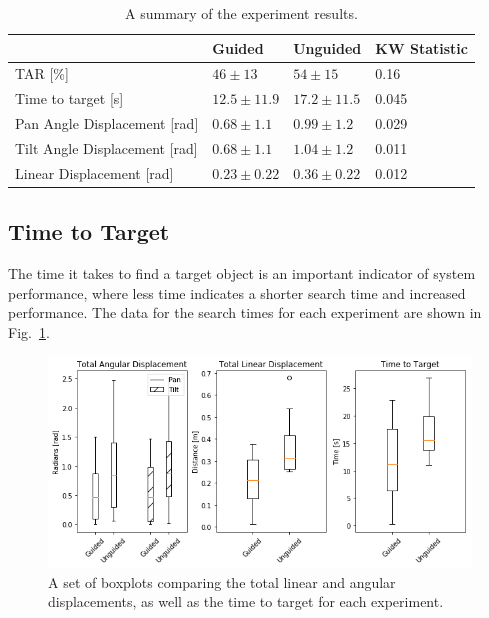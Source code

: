 \documentclass[runningheads]{llncs}
\begin{document}
\begin{table}
  \centering
  \caption{A summary of the experiment results. }\label{tab:results}
  \begin{tabular}{p{5cm}p{2cm}p{2cm}p{2.5cm}}
    \toprule
    & \textbf{Guided}             & \textbf{Unguided} & \textbf{KW Statistic} \\\midrule
    TAR [\%]                      & $46\pm13$         & $54\pm15$     &  0.16 \\\midrule
    Time to target [s]            & $12.5\pm11.9$     & $17.2\pm11.5$ & 0.045 \\\midrule
    Pan Angle Displacement [rad]  & $0.68\pm1.1$      & $0.99\pm1.2$  & 0.029 \\\midrule
    Tilt Angle Displacement [rad] & $0.68\pm1.1$      & $1.04\pm1.2$  & 0.011 \\\midrule
    Linear Displacement [rad]     & $0.23\pm0.22$     & $0.36\pm0.22$ & 0.012 \\\midrule
    \bottomrule
  \end{tabular}
\end{table}

\subsection{Time to Target}

The time it takes to find a target object is an important indicator of system performance, where less time indicates a shorter search time and increased performance.
The data for the search times for each experiment are shown in Fig.~\ref{fig:boxplots}.

\begin{figure}[t]
  \centering
  \includegraphics[width=1.0\textwidth]{figures/boxplot_combined.png}
  \caption{A set of boxplots comparing the total linear and angular displacements, as well as the time to target for each experiment. }\label{fig:boxplots}
\end{figure}
\end{document}

